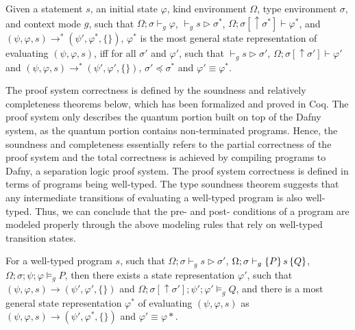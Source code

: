 \begin{definition}\label{def:most-gen}\rm 
  Given a statement $s$, an initial state $\varphi$, kind environment $\Omega$, type environment $\sigma$, and context mode $g$, such that $\Omega;\sigma\vdash_g \varphi$, $\vdash_g s \triangleright \sigma^*$, $\Omega;\sigma[\uparrow \sigma^*]\vdash \varphi^*$, and $(\psi,\varphi,s) \longrightarrow^{*} (\psi',\varphi^*,\{\})$, $\varphi^*$ is the most general state representation of evaluating $(\psi,\varphi,s)$, iff for all $\sigma'$ and $\varphi'$, such that $\vdash_g s \triangleright \sigma'$, $\Omega;\sigma[\uparrow \sigma']\vdash \varphi'$ and $(\psi,\varphi,s) \longrightarrow^{*} (\psi',\varphi',\{\})$, $\sigma' \preceq \sigma^*$ and $\varphi' \equiv \varphi^*$.
\end{definition}

The \qafny proof system correctness is defined by the soundness and relatively completeness theorems below, which has been formalized and proved in Coq. The \qafny proof system only describes the quantum portion built on top of the Dafny system, as the quantum portion contains non-terminated programs. Hence, the soundness and completeness essentially refers to the partial correctness of the \qafny proof system and the total correctness is achieved by compiling \qafny programs to Dafny, a separation logic proof system. The \qafny proof system correctness is defined in terms of programs being well-typed. The type soundness theorem suggests that any intermediate transitions of evaluating a well-typed \qafny program is also well-typed. Thus, we can conclude that the pre- and post- conditions of a program are modeled properly through the above modeling rules that rely on well-typed transition states.

\begin{theorem}\label{thm:proof-soundness}\rm 
For a well-typed program $s$, such that $\Omega;\sigma\vdash_g s \triangleright \sigma'$, $\Omega;\sigma\vdash_{g}\{P\}\, s \,\{Q\}$, $\Omega;\sigma;\psi;\varphi\models_g P$, then there exists a state representation $\varphi'$, such that $(\psi,\varphi,s)\longrightarrow (\psi',\varphi',\{\})$ and $\Omega;\sigma[\uparrow\sigma'];\psi';\varphi'\models_g Q$, and there is a most general state representation $\varphi^*$ of evaluating $(\psi,\varphi,s)$ as $(\psi,\varphi,s)\longrightarrow (\psi',\varphi^*,\{\})$ and $\varphi' \equiv \varphi*$.
\end{theorem}

